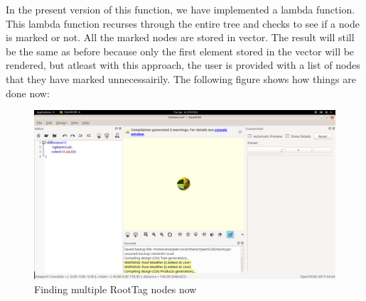 In the present version of this function, we have implemented a lambda function. This lambda function recurses through the entire tree and checks to see if a node is marked or not. All the marked nodes are stored in vector. The result will still be the same as before because only the first element stored in the vector will be rendered, but atleast with this approach, the user is provided with a list of nodes that they have marked unnecessairily. The following figure shows how things are done now:\\
\begin{figure}
	\centering
	\includegraphics[width=\linewidth]{images/output/now_right.png}
	\caption{Finding multiple RootTag nodes now}
\end{figure}
